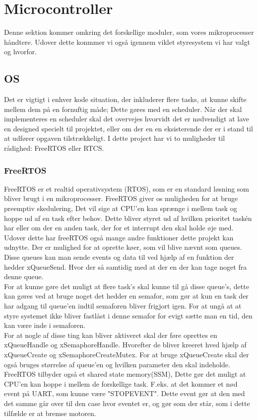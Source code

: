\section{Microcontroller}

Denne sektion kommer omkring det forskellige moduler, som vores mikroprocesser håndtere. Udover dette konmmer vi også igennem viklet styresystem vi har valgt og hvorfor.

\subsection{OS}
Det er vigtigt i enhver kode situation, der inkluderer flere tasks, at kunne skifte mellem dem på en fornuftig måde; Dette gøres med en scheduler. Når der skal implementeres en scheduler skal det overvejes hvorvidt det er nødvendigt at lave en designed specielt til projektet, eller om der en en eksisterende der er i stand til at udfører opgaven tilstrækkeligt. I dette project har vi to muligheder til rådighed: FreeRTOS eller RTCS.



\subsubsection{FreeRTOS}

FreeRTOS \cite{FreeRTOSorg} er et realtid operativsystem (RTOS), som er en standard løsning som bliver brugt i en mikroprocesser. FreeRTOS giver os muligheden for at bruge preemptiv skedulering, Det vil sige at CPU'en kan sprænge i mellem task og hoppe ud af en task efter behov. Dette bliver styret ud af hvilken prioritet taskén har eller om der en anden task, der for et interrupt den skal holde øje med.
\\
Udover dette har freeRTOS også mange andre funktioner dette projekt kan udnytte. Der er mulighed for at oprette køer, som vil blive nævnt som queues. Disse queues kan man sende events og data til ved hjælp af en funktion der hedder xQueueSend. Hvor der så samtidig med at der en der kan tage noget fra denne queue. 
\\
For at kunne gøre det muligt at flere task's skal kunne til gå disse queue's, dette kan gøres ved at bruge noget det hedder en semafor, som gør at kun en task der har adgang til queue'en indtil semaforen bliver frigjort igen. For at ungå at at styre systemet ikke bliver fastlåst i denne semafor for evigt sætte man en tid, den kan være inde i semaforen.
\\
For at nogle af disse ting kan bliver aktiveret skal der føre oprettes en xQueueHandle og xSemaphoreHandle. Hvorefter de bliver kreeret hved hjælp af xQueueCreate og xSemaphoreCreateMutex. For at bruge xQueueCreate skal der også bruges størrelse af queue'en og hvilken parameter den skal indeholde.
\\
FreeRTOS tilbyder også et shared state memory(SSM), Dette gør det muligt at CPU'en kan hoppe i mellem de forskellige task. F.eks. at det kommer et nød event på UART, som kunne være "STOP\textunderscore EVENT". Dette event gør at den med det samme går over til den case hvor eventet er, og gør som der står, som i dette tilfælde er at bremse motoren.

